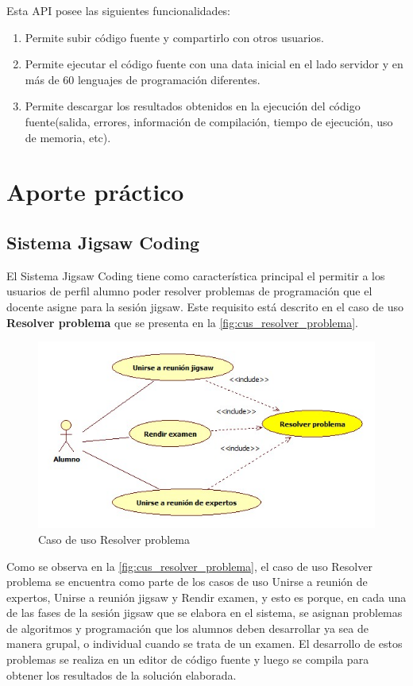 \documentclass[twoside]{article}
\begin{document}
\begin{multicols}{2}
Esta API posee las siguientes funcionalidades:

\begin{enumerate}
	\item Permite subir código fuente y compartirlo con otros usuarios.
	\item Permite ejecutar el código fuente con una data inicial en el lado servidor y en más de 60 lenguajes de programación diferentes.
	\item Permite descargar los resultados obtenidos en la ejecución del código fuente(salida, errores, información de compilación, tiempo de ejecución, uso de memoria, etc).
\end{enumerate}

\section{Aporte práctico}
\subsection*{Sistema Jigsaw Coding}
El Sistema Jigsaw Coding tiene como característica principal el permitir a los usuarios de perfil alumno poder resolver problemas de programación que el docente asigne para la sesión jigsaw. Este requisito está descrito en el caso de uso \textbf{Resolver problema} que se presenta en la \autoref{fig:cus_resolver_problema}. 

\begin{figure}[H]
	\centering	
	\includegraphics[scale=0.35]{figuras/casosdeuso/resolver_problema.jpg}
	\caption{Caso de uso Resolver problema}
	\label{fig:cus_resolver_problema}
\end{figure}

Como se observa en la \autoref{fig:cus_resolver_problema}, el caso de uso Resolver problema se encuentra como parte de los casos de uso Unirse a reunión de expertos, Unirse a reunión jigsaw y Rendir examen, y esto es porque, en cada una de las fases de la sesión jigsaw que se elabora en el sistema, se asignan problemas de algoritmos y programación que los alumnos deben desarrollar ya sea de manera grupal, o individual cuando se trata de un examen. El desarrollo de estos problemas se realiza en un editor de código fuente y luego se compila para obtener los resultados de la solución elaborada. 


\end{multicols}
\end{document}
